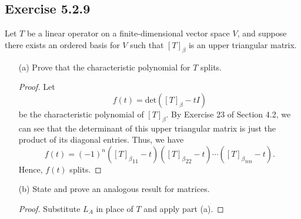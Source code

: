 \subsection*{Exercise 5.2.9} Let \( T \) be a linear operator on a finite-dimensional vector space \( V  \), and suppose there exists an ordered basis for \( V  \) such that \( [T]_{\beta} \) is an upper triangular matrix.  
\begin{enumerate}
    \item[(a)] Prove that the characteristic polynomial for \( T  \) splits.
        \begin{proof}
        Let 
        \[  f(t) = \text{det}([T]_{\beta} - tI) \]
        be the characteristic polynomial of \( [T]_{\beta}  \). By Exercise 23 of Section 4.2, we can see that the determinant of this upper triangular matrix is just the product of its diagonal entries. Thus, we have 
        \[  f(t) = (-1)^{n} ({[T]_{\beta}}_{11} - t)({[T]_{\beta}}_{22} - t) \cdots ({[T]_{\beta}}_{nn}  - t). \]
        Hence, \( f(t)  \) splits.
        \end{proof}
    \item[(b)] State and prove an analogous result for matrices.
        \begin{proof}
        Substitute \( {L}_{A} \) in place of \( T  \) and apply part (a).
        \end{proof}
\end{enumerate}

